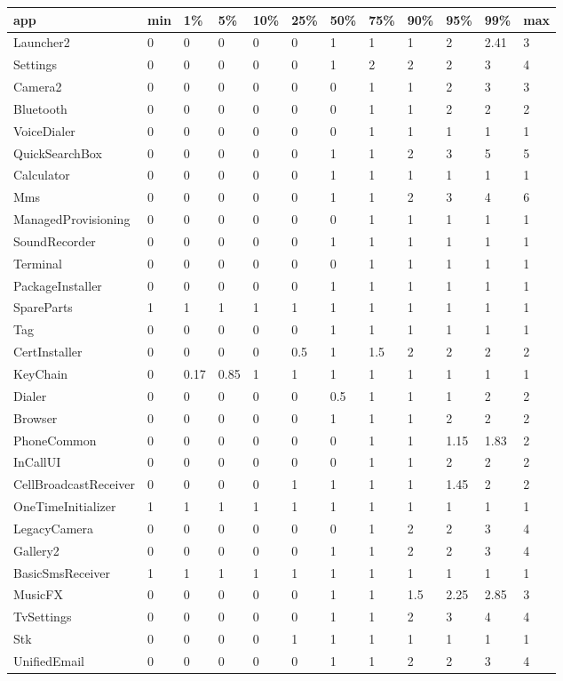 \begin{tabular}{|l|l|l|l|l|l|l|l|l|l|l|l|}
\hline
app&min&1\%&5\%&10\%&25\%&50\%&75\%&90\%&95\%&99\%&max\\
\hline
Launcher2&0&0&0&0&0&1&1&1&2&2.41&3\\
\hline
Settings&0&0&0&0&0&1&2&2&2&3&4\\
\hline
Camera2&0&0&0&0&0&0&1&1&2&3&3\\
\hline
Bluetooth&0&0&0&0&0&0&1&1&2&2&2\\
\hline
VoiceDialer&0&0&0&0&0&0&1&1&1&1&1\\
\hline
QuickSearchBox&0&0&0&0&0&1&1&2&3&5&5\\
\hline
Calculator&0&0&0&0&0&1&1&1&1&1&1\\
\hline
Mms&0&0&0&0&0&1&1&2&3&4&6\\
\hline
ManagedProvisioning&0&0&0&0&0&0&1&1&1&1&1\\
\hline
SoundRecorder&0&0&0&0&0&1&1&1&1&1&1\\
\hline
Terminal&0&0&0&0&0&0&1&1&1&1&1\\
\hline
PackageInstaller&0&0&0&0&0&1&1&1&1&1&1\\
\hline
SpareParts&1&1&1&1&1&1&1&1&1&1&1\\
\hline
Tag&0&0&0&0&0&1&1&1&1&1&1\\
\hline
CertInstaller&0&0&0&0&0.5&1&1.5&2&2&2&2\\
\hline
KeyChain&0&0.17&0.85&1&1&1&1&1&1&1&1\\
\hline
Dialer&0&0&0&0&0&0.5&1&1&1&2&2\\
\hline
Browser&0&0&0&0&0&1&1&1&2&2&2\\
\hline
PhoneCommon&0&0&0&0&0&0&1&1&1.15&1.83&2\\
\hline
InCallUI&0&0&0&0&0&0&1&1&2&2&2\\
\hline
CellBroadcastReceiver&0&0&0&0&1&1&1&1&1.45&2&2\\
\hline
OneTimeInitializer&1&1&1&1&1&1&1&1&1&1&1\\
\hline
LegacyCamera&0&0&0&0&0&0&1&2&2&3&4\\
\hline
Gallery2&0&0&0&0&0&1&1&2&2&3&4\\
\hline
BasicSmsReceiver&1&1&1&1&1&1&1&1&1&1&1\\
\hline
MusicFX&0&0&0&0&0&1&1&1.5&2.25&2.85&3\\
\hline
TvSettings&0&0&0&0&0&1&1&2&3&4&4\\
\hline
Stk&0&0&0&0&1&1&1&1&1&1&1\\
\hline
UnifiedEmail&0&0&0&0&0&1&1&2&2&3&4\\

\end{tabular}
